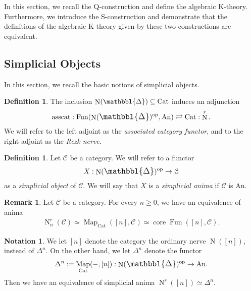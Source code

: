 \documentclass[a4paper,dvipdfmx,11pt,reqno]{amsart}
\DeclareMathOperator{\Map}{Map}
\DeclareMathOperator{\myop}{op}
\DeclareMathOperator{\N}{N}
\DeclareMathOperator{\Fun}{Fun}
\newcommand{\C}{\mathcal{C}}
\DeclareMathOperator{\core}{core}
\DeclareMathOperator{\asscat}{asscat}
\newcommand{\An}{\mathrm{An}}
\newcommand{\Cat}{\mathrm{Cat}}
\newcommand{\prism}{{\mathlarger{\mathbbl{\Delta}}}}
\theoremstyle{definition}
\newtheorem{definition}[theorem]{Definition}
\newtheorem{notation}[theorem]{Notation}
\newtheorem{remark}[theorem]{Remark}
\begin{document}
In this section, we recall the Q-construction and define the algebraic K-theory. 
Furthermore, we introduce the S-construction and demonstrate that the definitions of the algebraic K-theory given by these two constructions are equivalent.

\subsection{Simplicial Objects}

In this section, we recall the basic notions of simplicial objects.

\begin{definition}
  The inclusion $\N(\prism) \subseteq \Cat$ induces an adjunction 
  \begin{align*}
    \asscat : \Fun(\N(\prism)^{\myop},\An) \rightleftarrows \Cat : \N^r.
  \end{align*}
  We will refer to the left adjoint as the \textit{associated category functor}, and to the right adjoint as the \textit{Rezk nerve}.
\end{definition}

\begin{definition}
  Let $\C$ be a category.
  We will refer to a functor 
  \begin{align*}
    X : \N(\prism)^{\myop} \to \C
  \end{align*}
  as a \textit{simplicial object} of $\C$.
  We will say that $X$ is a \textit{simplicial anima} if $\C$ is $\An$.
\end{definition}

\begin{remark}
  Let $\C$ be a category.
  For every $n \geq 0$, we have an equivalence of anima
  \begin{align*}
    \N^r_n(\C) \simeq \Map_{\Cat}([n],\C) \simeq \core\Fun([n],\C).
  \end{align*}
\end{remark}

\begin{notation}
  We let $[n]$ denote the category the ordinary nerve $\N([n])$, instead of $\Delta^n$.
  On the other hand, we let $\Delta^n$ denote the functor 
  \begin{align*}
    \Delta^n := \Map_{\Cat}(-,[n]) : \N(\prism)^{\myop} \to \An.
  \end{align*}
  Then we have an equivalence of simplicial anima $\N^r([n]) \simeq \Delta^n$.
\end{notation}
\end{document}
